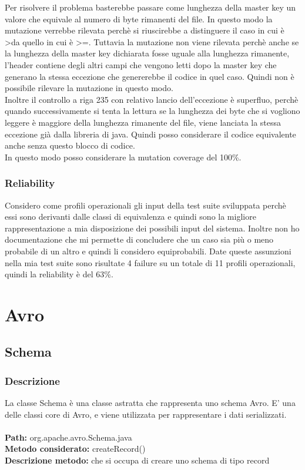 \documentclass[10pt, a4paper]{article}
\begin{document}
Per risolvere il problema basterebbe passare come lunghezza della master key un valore che equivale al numero di byte rimanenti
del file. In questo modo la mutazione verrebbe rilevata perchè si riuscirebbe a distinguere il caso in cui è \textgreater da quello in cui
è \textgreater=. Tuttavia la mutazione non viene rilevata perchè anche se la lunghezza della master key dichiarata fosse uguale alla
lunghezza rimanente, l'header contiene degli altri campi che vengono letti dopo la master key che generano la stessa eccezione 
che genererebbe il codice in quel caso. Quindi non è possibile rilevare la mutazione in questo modo. \\
Inoltre il controllo a riga 235 con relativo lancio dell'eccezione è superfluo, perchè quando successivamente si tenta la lettura
se la lunghezza dei byte che si vogliono leggere è maggiore della lunghezza rimanente del file, viene lanciata la stessa eccezione
già dalla libreria di java. Quindi posso considerare il codice equivalente anche senza questo blocco di codice. \\
In questo modo posso considerare la mutation coverage del 100\%.

\subsubsection{Reliability}
Considero come profili operazionali gli input della test suite sviluppata perchè essi sono derivanti dalle classi di equivalenza
e quindi sono la migliore rappresentazione a mia disposizione dei possibili input del sistema. Inoltre non ho documentazione che
mi permette di concludere che un caso sia più o meno probabile di un altro e quindi li considero equiprobabili. Date queste 
assunzioni nella mia test suite sono risultate 4 failure su un totale di 11 profili operazionali, quindi la reliability è del 63\%.

\newpage
\section{Avro}
\subsection{Schema}
\subsubsection{Descrizione}
La classe Schema è una classe astratta che rappresenta uno schema Avro. E' una delle classi core di Avro, e viene utilizzata
per rappresentare i dati serializzati. \\ \\
\textbf{Path:} org.apache.avro.Schema.java \\
\textbf{Metodo considerato:} createRecord() \\
\textbf{Descrizione metodo:} che si occupa di creare uno schema di tipo record 
\end{document}
